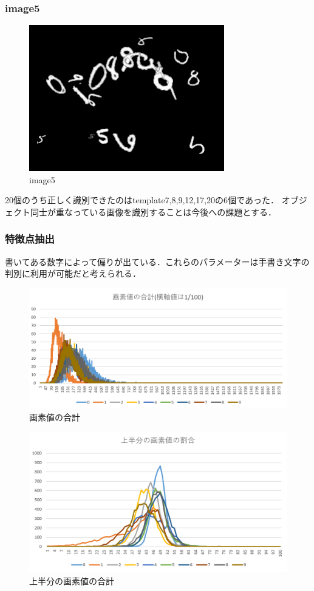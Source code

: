\documentclass[platex,dvipdfmx]{jsarticle}
\begin{document}
\newpage

\subsubsection{image5}
\begin{figure}[h]
\centering
\includegraphics[clip,width = 8.5cm]{images/image5.png}
\caption{image5}
\label{graph5}
\end{figure}
20個のうち正しく識別できたのはtemplate7,8,9,12,17,20の6個であった．
オブジェクト同士が重なっている画像を識別することは今後への課題とする．

\newpage

\subsubsection{特徴点抽出}

書いてある数字によって偏りが出ている．これらのパラメーターは手書き文字の判別に利用が可能だと考えられる．
\begin{figure}[h]
\centering
\includegraphics[width = 11.5cm]{images/graph/summation.PNG}
\caption{画素値の合計}
\label{summation}
\end{figure}

\begin{figure}[h]
\centering
\includegraphics[width = 11.5cm]{images/graph/upper.PNG}
\caption{上半分の画素値の合計}
\label{upper}
\end{figure}
\end{document}
